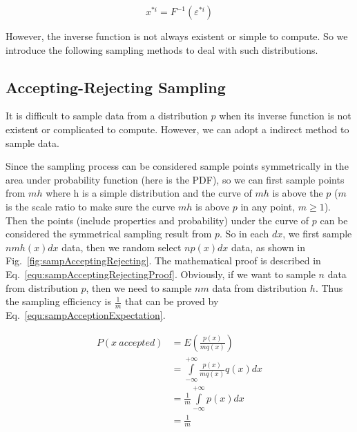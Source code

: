 \documentclass[runningheads,openany]{xhlPaper}
\begin{document}
\begin{equation}
\label{equ:sampContinuous}
{x^{*i}} = {F^{ - 1}}\left( {{\varepsilon ^{*i}}} \right)
\end{equation}

However, the inverse function is not always existent or simple to compute. So we introduce the following sampling methods to deal with such distributions.

\subsection{Accepting-Rejecting Sampling}
\label{sec:sampAcceptingRejecting}
It is difficult to sample data from a distribution $p$ when its inverse function is not existent or complicated to compute. However, we can adopt a indirect method to sample data. 

Since the sampling process can be considered sample points symmetrically in the area under probability function (here is the PDF), so we can first sample points from $mh$ where h is a simple distribution and the curve of $mh$ is above the $p$ ($m$ is the scale ratio to make sure the curve $mh$ is above $p$ in any point, $m \ge 1$). 
Then the points (include properties and probability) under the curve of $p$ can be considered the symmetrical sampling result from $p$. 
So in each $dx$, we first sample $nmh\left(x\right)dx$ data, then we random select $np\left(x\right)dx$ data, as shown in Fig.~\ref{fig:sampAcceptingRejecting}. The mathematical proof is described in Eq.~\ref{equ:sampAcceptingRejectingProof}. Obviously, if we want to sample $n$ data from distribution $p$, then we need to sample $nm$ data from distribution $h$. Thus the sampling efficiency is $\frac{1}{m}$ that can be proved by Eq.~\ref{equ:sampAcceptionExpectation}.

\begin{equation}
\label{equ:sampAcceptionExpectation}
\begin{aligned}
P\left( {x\ accepted} \right) &= E\left( {\frac{{p\left( x \right)}}{{mq\left( x \right)}}} \right)\\
 &= \int\limits_{ - \infty }^{ + \infty } {\frac{{p\left( x \right)}}{{mq\left( x \right)}}q\left( x \right)dx} \\
 &= \frac{1}{m}\int\limits_{ - \infty }^{ + \infty } {p\left( x \right)dx} \\
 &= \frac{1}{m}
\end{aligned}
\end{equation}
\end{document}

